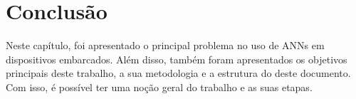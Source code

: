 \section{Conclusão}
Neste capítulo, foi apresentado o principal problema no uso de ANNs em dispositivos embarcados.
Além disso, também foram apresentados os objetivos principais deste trabalho, a sua metodologia e a estrutura do deste
documento. Com isso, é possível ter uma noção geral do trabalho e as suas etapas.
